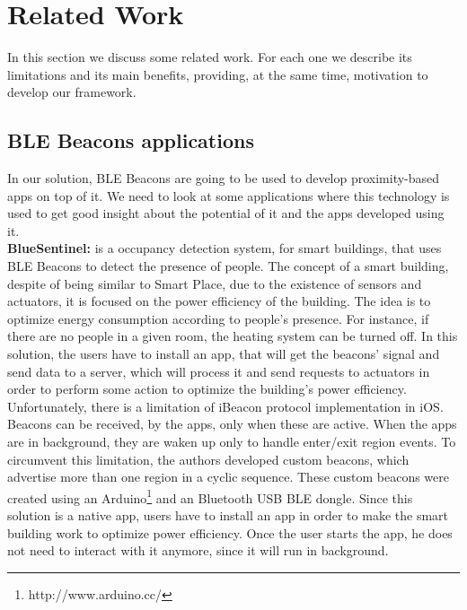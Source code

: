 
%
%

\section{Related Work}
\label{sec:related_work}
In this section we discuss some related work.
For each one we describe its limitations and its main
benefits, providing, at the same time, motivation
to develop our framework.

\subsection{BLE Beacons applications}
\label{sub:ble_beacons_applications}
In our solution, BLE Beacons are going to
be used to develop proximity-based apps
on top of it. We need to look at some
applications where this technology is used to
get good insight about the potential of it
and the apps developed using it.
\\
\textbf{BlueSentinel:}\cite{Conte2014} is a 
occupancy detection system, for smart buildings,
that uses BLE Beacons to detect the presence of
people. The concept of a smart building,
despite of being similar to Smart Place,
due to the existence of sensors and actuators,
it is focused on the power efficiency of the
building. The idea is to optimize energy
consumption according to people's presence.
For instance, if there are no people in a given room,
the heating system can be turned off.
In this solution, the users have to install
an app, that will get the beacons' signal and
send data to a server, which will process it
and send requests to actuators in order to
perform some action to optimize the
building's power efficiency.
Unfortunately, there is a limitation
of iBeacon protocol implementation
in iOS. Beacons can be received, by the apps,
only when these are active. When the apps are in
background, they are waken up only to handle
enter/exit region events. To circumvent this
limitation, the authors developed custom
beacons, which advertise more than one region
in a cyclic sequence. These custom beacons
were created using an 
Arduino\footnote{http://www.arduino.cc/}
and an Bluetooth USB BLE dongle.
Since this solution is a native app,
users have to install an app in order
to make the smart building work to
optimize power efficiency.
Once the user starts the app, he does not
need to interact with it anymore, since it
will run in background.
\\
